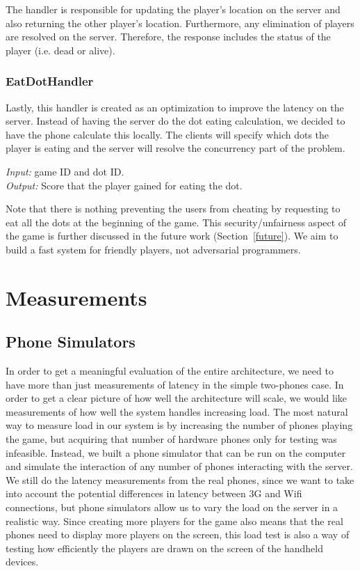 \documentclass{acm_proc_article-sp}
\begin{document}
The handler is responsible for updating the player's location on the
server and also returning the other player's location. Furthermore,
any elimination of players are resolved on the server. Therefore, the
response includes the status of the player (i.e. dead or alive).

\subsubsection{EatDotHandler}
Lastly, this handler is created as an optimization to improve the
latency on the server. Instead of having the server do the dot eating
calculation, we decided to have the phone calculate this locally. The
clients will specify which dots the player is eating and the server
will resolve the concurrency part of the problem.

\emph{Input:} game ID and dot ID.\\
\emph{Output:} Score that the player gained for eating the dot.

Note that there is nothing preventing the users from cheating by
requesting to eat all the dots at the beginning of the game. This
security/unfairness aspect of the game is further discussed in the
future work (Section~\ref{future}). We aim to build a fast system for
friendly players, not adversarial programmers.

\section{Measurements}
\subsection{Phone Simulators}
In order to get a meaningful evaluation of the entire architecture, we
need to have more than just measurements of latency in the simple
two-phones case.  In order to get a clear picture of how well the
architecture will scale, we would like measurements of how well the
system handles increasing load.  The most natural way to measure load
in our system is by increasing the number of phones playing the game,
but acquiring that number of hardware phones only for testing was
infeasible.  Instead, we built a phone simulator that can be run on
the computer and simulate the interaction of any number of phones
interacting with the server. We still do the latency measurements from
the real phones, since we want to take into account the potential
differences in latency between 3G and Wifi connections, but phone
simulators allow us to vary the load on the server in a realistic
way. Since creating more players for the game also means that the real
phones need to display more players on the screen, this load test is
also a way of testing how efficiently the players are drawn on the
screen of the handheld devices.
\end{document}
